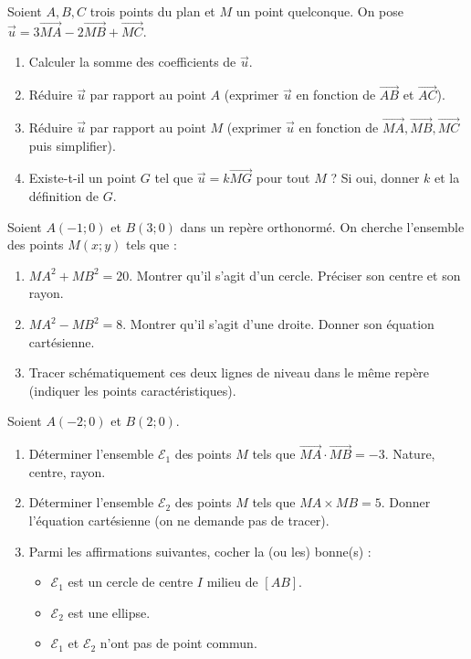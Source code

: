 \documentclass[11pt]{article}
\begin{document}
\begin{exercice}
Soient $A, B, C$ trois points du plan et $M$ un point quelconque. On pose $\vec{u} = 3\overrightarrow{MA} - 2\overrightarrow{MB} + \overrightarrow{MC}$.
\begin{enumerate}
    \item Calculer la somme des coefficients de $\vec{u}$.
    \item Réduire $\vec{u}$ par rapport au point $A$ (exprimer $\vec{u}$ en fonction de $\overrightarrow{AB}$ et $\overrightarrow{AC}$).
    \item Réduire $\vec{u}$ par rapport au point $M$ (exprimer $\vec{u}$ en fonction de $\overrightarrow{MA}, \overrightarrow{MB}, \overrightarrow{MC}$ puis simplifier).
    \item Existe-t-il un point $G$ tel que $\vec{u} = k\overrightarrow{MG}$ pour tout $M$ ? Si oui, donner $k$ et la définition de $G$.
\end{enumerate}
\end{exercice}

\begin{exercice}[Lignes de niveau : $MA^2 + MB^2 = k$ et $MA^2 - MB^2 = k$]
Soient $A(-1;0)$ et $B(3;0)$ dans un repère orthonormé. On cherche l'ensemble des points $M(x;y)$ tels que :
\begin{enumerate}
    \item $MA^2 + MB^2 = 20$. Montrer qu'il s'agit d'un cercle. Préciser son centre et son rayon.
    \item $MA^2 - MB^2 = 8$. Montrer qu'il s'agit d'une droite. Donner son équation cartésienne.
    \item Tracer schématiquement ces deux lignes de niveau dans le même repère (indiquer les points caractéristiques).
\end{enumerate}
\end{exercice}

\begin{exercice}[Lignes de niveau : $\overrightarrow{MA} \cdot \overrightarrow{MB} = k$ et $MA \cdot MB = k$]
Soient $A(-2;0)$ et $B(2;0)$.
\begin{enumerate}
    \item Déterminer l'ensemble $\mathcal{E}_1$ des points $M$ tels que $\overrightarrow{MA} \cdot \overrightarrow{MB} = -3$. Nature, centre, rayon.
    \item Déterminer l'ensemble $\mathcal{E}_2$ des points $M$ tels que $MA \times MB = 5$. Donner l'équation cartésienne (on ne demande pas de tracer).
    \item Parmi les affirmations suivantes, cocher la (ou les) bonne(s) :
    \begin{itemize}
        \item[$\square$] $\mathcal{E}_1$ est un cercle de centre $I$ milieu de $[AB]$.
        \item[$\square$] $\mathcal{E}_2$ est une ellipse.
        \item[$\square$] $\mathcal{E}_1$ et $\mathcal{E}_2$ n'ont pas de point commun.
    \end{itemize}
\end{enumerate}
\end{exercice}
\end{document}
